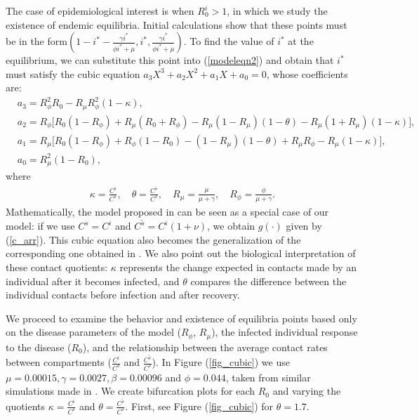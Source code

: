 \documentclass[sn-basic]{sn-jnl}%
\theoremstyle{thmstyleone}%
\theoremstyle{thmstyletwo}%
\theoremstyle{thmstylethree}%
\newcommand{\ws}{\widetilde{s}}
\begin{document}
The case of epidemiological interest is when $R_0^i>1$, in which we study the existence of endemic equilibria. Initial calculations show that these points must be in the form$
\left(1-i^*-\frac{\gamma i^*}{\phi i^*+ \mu}, i^*, \frac{\gamma i^*}{\phi i^*+ \mu}\right)$. To find the value of $i^*$ at the equilibrium, we can substitute this point into (\ref{modeleqn2}) and obtain that $i^*$ must satisfy the cubic equation $a_3X^3+ a_2 X^2 + a_1X + a_0 = 0$, whose coefficients are:
\begin{align}\label{coefficients}
    & a_3 = R_\phi^2 R_0 - R_\mu R_\phi^2\left(1- \kappa\right), \nonumber \\
    & a_2 = R_\phi \biggl[R_0(1-R_\phi) +R_\mu( R_0 + R_\phi) - R_\mu(1-R_\mu)\left(1- \theta\right) -R_\mu (1+R_\mu)\left(1 - \kappa\right) \biggr],  \nonumber \\
    & a_1 = R_\mu \biggl[ R_0(1-R_\phi) +  R_\phi(1-R_0) - (1-R_\mu)\left(1 - \theta\right) + R_\mu R_\phi - R_\mu \left(1 - \kappa\right) \biggr],  \nonumber \\
    & a_0 = R_\mu^2(1-R_0),
\end{align}
where 
\begin{align}\label{rphirmu}
    \kappa = \frac{C^i}{C^s},  \quad
 \theta = \frac{C^{\ws}}{C^s}, \quad R_{\mu}=\frac{\mu}{\mu+\gamma}, \quad R_\phi = \frac{\phi}{\mu+\gamma}.
\end{align}
Mathematically, the model proposed in \cite{Arr22} can be seen as a special case of our model: if we use $C^s=C^i$ and $C^{\ws}=C^i(1+\nu)$, we obtain $g(\cdot)$ given by (\ref{c_arr}). This cubic equation also becomes the generalization of the corresponding one obtained in \cite{Arr22}. We also point out the biological interpretation of these contact quotients: $\kappa$ represents the change expected in contacts made by an individual after it becomes infected, and $\theta$ compares the difference between the individual contacts before infection and after recovery.

We proceed to examine the behavior and existence of equilibria points based only on the disease parameters of the model ($R_\phi$, $R_\mu$), the infected individual response to the disease ($R_0$), and the relationship between the average contact rates between compartments ($\frac{C^i}{C^s}$ and $\frac{C^{\ws}}{C^s}$). In Figure (\ref{fig_cubic}) we use  $\mu = 0.00015, \gamma = 0.0027, \beta = 0.00096$ and $\phi = 0.044$, taken from similar simulations made in \cite{Arr22}. We create bifurcation plots for each $R_0$ and varying the quotients $\kappa = \frac{C^i}{C^s}$ and $\theta = \frac{C^{\ws}}{C^s}$. First, see Figure (\ref{fig_cubic}) for $\theta = 1.7$.
\end{document}

